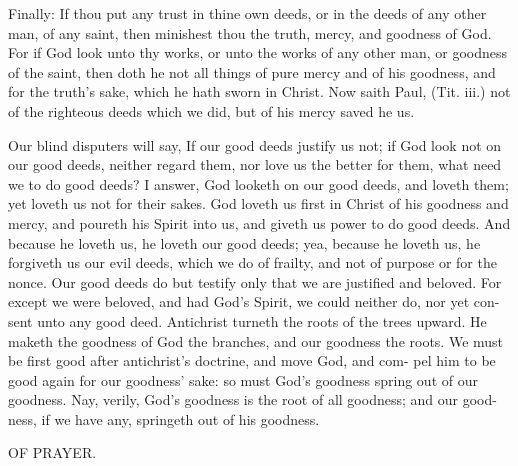 \documentclass{custom}
\begin{document}
Finally: If thou put any trust in thine own deeds, or 
in the deeds of any other man, of any saint, then minishest 
thou the truth, mercy, and goodness of God. For if God 
look unto thy works, or unto the works of any other man, 
or goodness of the saint, then doth he not all things of 
pure mercy and of his goodness, and for the truth's sake, 
which he hath sworn in Christ. Now saith Paul, (Tit. iii.) 
not of the righteous deeds which we did, but of his 
mercy saved he us. 

Our blind disputers will say, If our good deeds justify 
us not; if God look not on our good deeds, neither regard 
them, nor love us the better for them, what need we to do 
good deeds? I answer, God looketh on our good deeds, 
and loveth them; yet loveth us not for their sakes. God 
loveth us first in Christ of his goodness and mercy, and 
poureth his Spirit into us, and giveth us power to do good 
deeds. And because he loveth us, he loveth our good 
deeds; yea, because he loveth us, he forgiveth us our evil 
deeds, which we do of frailty, and not of purpose or for 
the nonce. Our good deeds do but testify only that we 
are justified and beloved. For except we were beloved, 
and had God's Spirit, we could neither do, nor yet con- 
sent unto any good deed. Antichrist turneth the roots of 
the trees upward. He maketh the goodness of God the 
branches, and our goodness the roots. We must be first 
good after antichrist's doctrine, and move God, and com- 
pel him to be good again for our goodness' sake: so must 
God's goodness spring out of our goodness. Nay, verily, 
God's goodness is the root of all goodness; and our good- 
ness, if we have any, springeth out of his goodness. 


OF PRAYER. 
\end{document}
